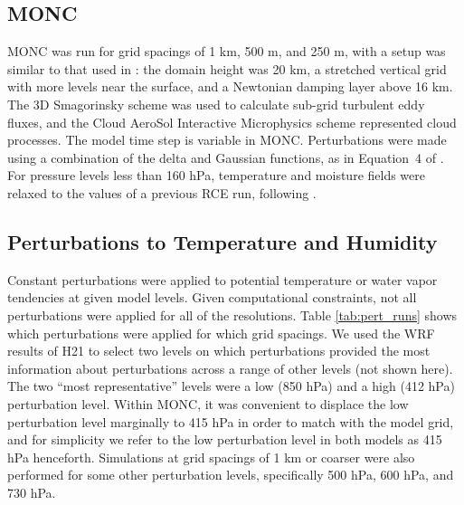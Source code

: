 \documentclass[draft]{agujournal2019}
\begin{document}
\subsection{MONC}

MONC was run for grid spacings of 1 km, 500 m, and 250 m, with a setup was
similar to that used in : the domain height was 20 km, a
stretched vertical grid with more levels near the surface, and a Newtonian
damping layer above 16 km. The 3D Smagorinsky scheme \cite{Smag63,Lilly67} was
used to calculate sub-grid turbulent eddy fluxes, and the Cloud AeroSol
Interactive Microphysics \cite<CASIM, see>{field23} scheme represented cloud
processes. The model time step is variable in MONC. Perturbations were made
using a combination of the delta and Gaussian functions, as in Equation~4 of
. For pressure levels less than 160 hPa, temperature
and moisture fields were relaxed to the values of a previous RCE run, following
.

\subsection{Perturbations to Temperature and Humidity}

Constant perturbations were applied to potential temperature or water vapor
tendencies at given model levels. Given computational constraints, not all
perturbations were applied for all of the resolutions.  Table
\ref{tab:pert_runs} shows which perturbations were applied for which grid
spacings. We used the WRF results of H21 to select two levels on which
perturbations provided the most information about perturbations across a range
of other levels (not shown here). The two ``most representative'' levels were a
low (850 hPa) and a high (412 hPa) perturbation level. Within MONC, it was
convenient to displace the low perturbation level marginally to 415 hPa in order
to match with the model grid, and for simplicity we refer to the low
perturbation level in both models as 415 hPa henceforth. Simulations at grid
spacings of 1 km or coarser were also performed for some other perturbation
levels, specifically 500 hPa, 600 hPa, and 730 hPa.
\end{document}
